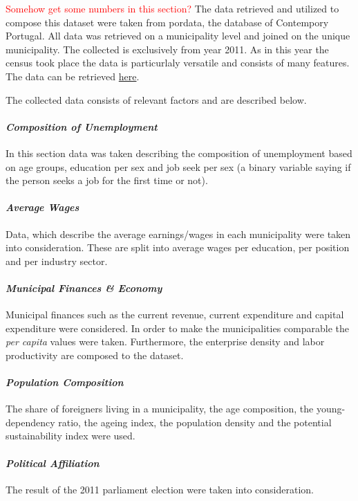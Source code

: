 \documentclass[12pt]{article}
\begin{document}
{
\textcolor{red}{Somehow get some numbers in this section?}
The data retrieved and utilized to compose this dataset were taken from pordata, the database of Contempory Portugal. All data was retrieved on a municipality level and joined on the unique municipality. The collected is exclusively from year 2011. As in this year the census took place the data is particurlaly versatile and consists of many features. The data can be retrieved \href{https://drive.google.com/open?id=1oQgpETAuAHQqdlWaiQMgGuqTx9VxdCZY}{here}.

The collected data consists of relevant factors and are described below.

\paragraph*{\textit{Composition of Unemployment}}
In this section data was taken describing the composition of unemployment based on age groups, education per sex and job seek per sex (a binary variable saying if the person seeks a job for the first time or not).

\paragraph*{\textit{Average Wages}}
Data, which describe the average earnings/wages in each municipality were taken into consideration. These are split into average wages per education, per position and per industry sector.

\paragraph*{\textit{Municipal Finances \& Economy}}
Municipal finances such as the current revenue, current expenditure and capital expenditure were considered. In order to make the municipalities comparable the \textit{per capita} values were taken. Furthermore, the enterprise density and labor productivity are composed to the dataset.

\paragraph*{\textit{Population Composition}}
The share of foreigners living in a municipality, the age composition, the young-dependency ratio, the ageing index, the population density and the potential sustainability index were used.

\paragraph*{\textit{Political Affiliation}}
The result of the 2011 parliament election were taken into consideration.

}
\end{document}
